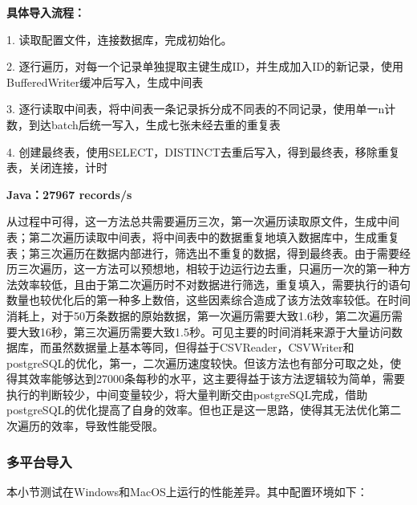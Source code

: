 \documentclass[11pt]{article}
\begin{document}
\hspace{-2em} \textbf{具体导入流程：}\par
\hspace{-1em}1. 读取配置文件，连接数据库，完成初始化。\par
\hspace{-1em}2. 逐行遍历，对每一个记录单独提取主键生成ID，并生成加入ID的新记录，使用BufferedWriter缓冲后写入，生成中间表\par
\hspace{-1em}3. 逐行读取中间表，将中间表一条记录拆分成不同表的不同记录，使用单一n计数，到达batch后统一写入，生成七张未经去重的重复表\par
\hspace{-1em}4. 创建最终表，使用SELECT，DISTINCT去重后写入，得到最终表，移除重复表，关闭连接，计时\par

\hspace{-1em}\par
\hspace{2em}\textbf{Java：27967 records/s}\par

\hspace{-1em}\par
从过程中可得，这一方法总共需要遍历三次，第一次遍历读取原文件，生成中间表；第二次遍历读取中间表，将中间表中的数据重复地填入数据库中，生成重复表；第三次遍历在数据内部进行，筛选出不重复的数据，得到最终表。由于需要经历三次遍历，这一方法可以预想地，相较于边运行边去重，只遍历一次的第一种方法效率较低，且由于第二次遍历时不对数据进行筛选，重复填入，需要执行的语句数量也较优化后的第一种多上数倍，这些因素综合造成了该方法效率较低。在时间消耗上，对于50万条数据的原始数据，第一次遍历需要大致1.6秒，第二次遍历需要大致16秒，第三次遍历需要大致1.5秒。可见主要的时间消耗来源于大量访问数据库，而虽然数据量上基本等同，但得益于CSVReader，CSVWriter和postgreSQL的优化，第一，二次遍历速度较快。但该方法也有部分可取之处，使得其效率能够达到27000条每秒的水平，这主要得益于该方法逻辑较为简单，需要执行的判断较少，中间变量较少，将大量判断交由postgreSQL完成，借助postgreSQL的优化提高了自身的效率。但也正是这一思路，使得其无法优化第二次遍历的效率，导致性能受限。

\subsubsection{多平台导入}
本小节测试在Windows和MacOS上运行的性能差异。其中配置环境如下：
\end{document}
